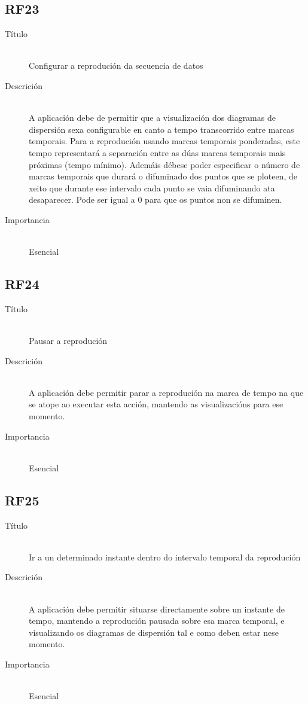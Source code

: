 \subsection*{RF23}
\begin{description}
\item[Título] \hfill \\
Configurar a reprodución da secuencia de datos
\item[Descrición] \hfill \\
A aplicación debe de permitir que a visualización dos diagramas de dispersión sexa configurable en canto a tempo transcorrido entre marcas temporais. Para a reprodución usando marcas temporais ponderadas, este tempo representará a separación entre as dúas marcas temporais mais próximas (tempo mínimo). Ademáis débese poder especificar o número de marcas temporais que durará o difuminado dos puntos que se ploteen, de xeito que durante ese intervalo cada punto se vaia difuminando ata desaparecer. Pode ser igual a 0 para que os puntos non se difuminen.
\item[Importancia] \hfill \\
Esencial
\end{description}

\subsection*{RF24}
\begin{description}
\item[Título] \hfill \\
Pausar a reprodución
\item[Descrición] \hfill \\
A aplicación debe permitir parar a reprodución na marca de tempo na que se atope ao executar esta acción, mantendo as visualizacións para ese momento.
\item[Importancia] \hfill \\
Esencial
\end{description}

\subsection*{RF25}
\begin{description}
\item[Título] \hfill \\
Ir a un determinado instante dentro do intervalo temporal da reprodución
\item[Descrición] \hfill \\
A aplicación debe permitir situarse directamente sobre un instante de tempo, mantendo a reprodución pausada sobre esa marca temporal, e visualizando os diagramas de dispersión tal e como deben estar nese momento.
\item[Importancia] \hfill \\
Esencial
\end{description}

